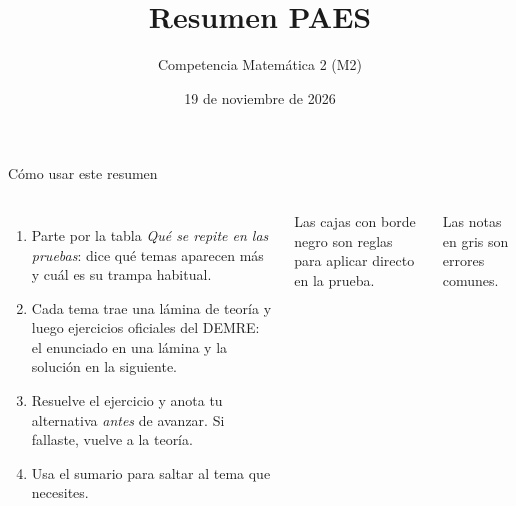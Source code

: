 \documentclass[aspectratio=169,11pt]{beamer}
\title[Resumen PAES: Competencia Matemática 2]{Resumen PAES}
\subtitle{Competencia Matemática 2 (M2)}
\date{19 de noviembre de 2026}
\begin{document}
\begin{frame}[plain]
  \titlepage
\end{frame}

\begin{frame}{Cómo usar este resumen}
\begin{columns}[T,onlytextwidth]
\small
\begin{enumerate}
\item Parte por la tabla \emph{Qué se repite en las pruebas}: dice qué temas aparecen más y cuál es su trampa habitual.
\item Cada tema trae una lámina de teoría y luego ejercicios oficiales del DEMRE: el enunciado en una lámina y la solución en la siguiente.
\item Resuelve el ejercicio y anota tu alternativa \emph{antes} de avanzar. Si fallaste, vuelve a la teoría.
\item Usa el sumario para saltar al tema que necesites.
\end{enumerate}
\begin{cajaregla}\footnotesize Las cajas con borde negro son reglas para aplicar directo en la prueba.\end{cajaregla}
\begin{notagris}\footnotesize Las notas en gris son errores comunes.\end{notagris}
\end{columns}
\end{frame}
\end{document}
